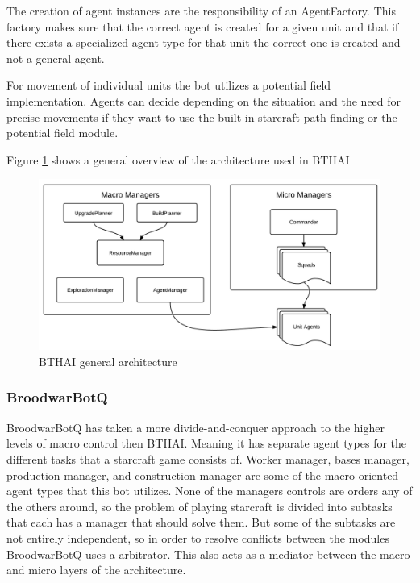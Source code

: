 The creation of agent instances are the responsibility of an AgentFactory. This factory makes sure that the correct agent is created for a given unit and that if there exists a specialized agent type for that unit the correct one is created and not a general agent. 

For movement of individual units the bot utilizes a potential field implementation. Agents can decide depending on the situation and the need for precise movements if they want to use the built-in starcraft path-finding or the potential field module. 

Figure \ref{fig:bthaiarch} shows a general overview of the architecture used in BTHAI


\begin{figure}[h!tbp]
\centering
\includegraphics[scale=0.8]{graphics/bthai.png}
\caption{BTHAI general architecture}
\label{fig:bthaiarch}
\end{figure}

\subsubsection{BroodwarBotQ}
BroodwarBotQ has taken a more divide-and-conquer approach to the higher levels of macro control then BTHAI. Meaning it has separate agent types for the different tasks that a starcraft game consists of. Worker manager, bases manager, production manager, and construction manager are some of the macro oriented agent types that this bot utilizes. None of the managers controls are orders any of the others around, so the problem of playing starcraft is divided into subtasks that each has a manager that should solve them. But some of the subtasks are not entirely independent, so in order to resolve conflicts between the modules BroodwarBotQ uses a arbitrator. This also acts as a mediator between the macro and micro layers of the architecture. 

